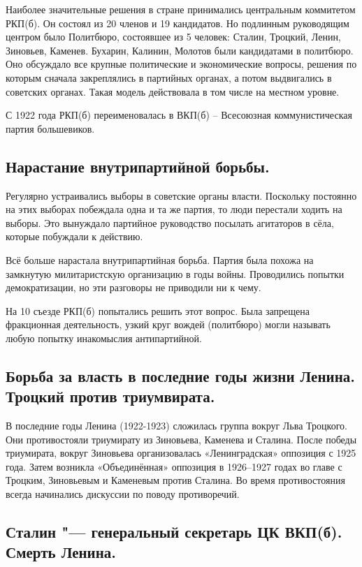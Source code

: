 Наиболее значительные решения в стране принимались центральным коммитетом РКП(б). Он состоял из 20 членов и 19 кандидатов. Но подлинным руководящим центром было Политбюро, состоявшее из 5 человек: Сталин, Троцкий, Ленин, Зиновьев, Каменев. Бухарин, Калинин, Молотов были кандидатами в политбюро. Оно обсуждало все крупные политические и экономические вопросы, решения по которым сначала закреплялись в партийных органах, а потом выдвигались в советских органах. Такая модель действовала в том числе на местном уровне.

С 1922 года РКП(б) переименовалась в ВКП(б) – Всесоюзная коммунистическая партия большевиков.

\subsection{Нарастание внутрипартийной борьбы.} 

Регулярно устраивались выборы в советские органы власти. Поскольку постоянно на этих выборах побеждала одна и та же партия, то люди перестали ходить на выборы. Это вынуждало партийное руководство посылать агитаторов в сёла, которые побуждали к действию.

Всё больше нарастала внутрипартийная борьба. Партия была похожа на замкнутую милитаристскую организацию в годы войны. Проводились попытки демократизации, но эти разговоры не приводили ни к чему.

На 10 съезде РКП(б) попытались решить этот вопрос. Была запрещена фракционная деятельность, узкий круг вождей (политбюро) могли называть любую попытку инакомыслия антипартийной.

\subsection{Борьба за власть в последние годы жизни Ленина. Троцкий против триумвирата.}

В последние годы Ленина (1922-1923) сложилась группа вокруг Льва Троцкого. Они противостояли триумирату из Зиновьева, Каменева и Сталина. После победы триумирата, вокруг Зиновьева организовалась «Ленинградская» оппозиция с 1925 года. Затем возникла «Объединённая» оппозиция в 1926--1927 годах во главе с Троцким, Зиновьевым и Каменевым против Сталина. Во время противостояния всегда начинались дискуссии по поводу противоречий.

\subsection{Сталин "--- генеральный секретарь ЦК ВКП(б). Смерть Ленина.}

